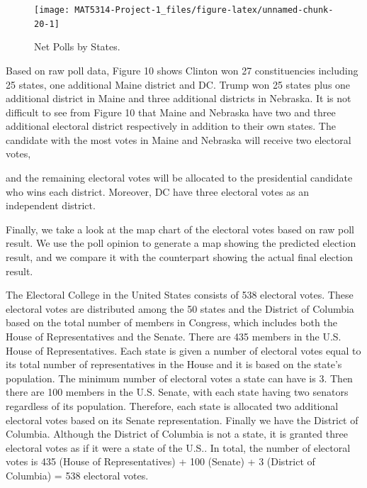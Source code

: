 \documentclass[
  12pt,
]{article}
\begin{document}
\begin{minipage}[t]{0.7\textwidth}
\begin{figure}
\texttt{[image: MAT5314-Project-1\_files/figure-latex/unnamed-chunk-20-1]} \caption{Net Polls by States.}\label{fig:unnamed-chunk-20}
\end{figure}
\end{minipage}
\begin{minipage}[t]{0.3\textwidth}
\vspace{0pt}
Based on raw poll data, Figure 10 shows Clinton won 27 constituencies including 25 states, one additional Maine district and DC. Trump won 25 states plus one additional district in Maine and three additional districts in Nebraska. It is not difficult to see from Figure 10 that Maine and Nebraska have two and three additional electoral district respectively in addition to their own states. The candidate with the most votes in Maine and Nebraska will receive two electoral votes,
\end{minipage}

and the remaining electoral votes will be allocated to the presidential
candidate who wins each district. Moreover, DC have three electoral
votes as an independent district.

Finally, we take a look at the map chart of the electoral votes based on
raw poll result. We use the poll opinion to generate a map showing the
predicted election result, and we compare it with the counterpart
showing the actual final election result.

The Electoral College in the United States consists of 538 electoral
votes. These electoral votes are distributed among the 50 states and the
District of Columbia based on the total number of members in Congress,
which includes both the House of Representatives and the Senate. There
are 435 members in the U.S. House of Representatives. Each state is
given a number of electoral votes equal to its total number of
representatives in the House and it is based on the state's population.
The minimum number of electoral votes a state can have is 3. Then there
are 100 members in the U.S. Senate, with each state having two senators
regardless of its population. Therefore, each state is allocated two
additional electoral votes based on its Senate representation. Finally
we have the District of Columbia. Although the District of Columbia is
not a state, it is granted three electoral votes as if it were a state
of the U.S.. In total, the number of electoral votes is 435 (House of
Representatives) + 100 (Senate) + 3 (District of Columbia) = 538
electoral votes.
\end{document}
